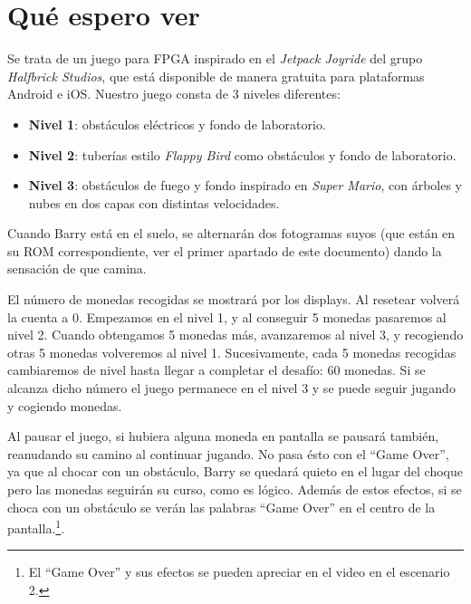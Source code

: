 \documentclass[11pt, a4paper, spanish, openright, twoside]{book}
\begin{document}
\section{Qué espero ver}
Se trata de un juego para FPGA inspirado en el  \emph{Jetpack Joyride} del grupo  \emph{Halfbrick Studios}, que está disponible de manera gratuita para plataformas Android e iOS. Nuestro juego consta de 3 niveles diferentes:

\begin{itemize}
	\item \textbf{Nivel 1}: obstáculos eléctricos y fondo de laboratorio.
	\item \textbf{Nivel 2}: tuberías estilo \emph{Flappy Bird} como obstáculos y fondo de laboratorio.
	\item \textbf{Nivel 3}: obstáculos de fuego y fondo inspirado en \emph{Super Mario}, con árboles y nubes en dos capas con distintas velocidades.
\end{itemize}

Cuando Barry está en el suelo, se alternarán dos fotogramas suyos (que están en su ROM correspondiente, ver el primer apartado de este documento) dando la sensación de que camina. 

El número de monedas recogidas se mostrará por los displays. Al resetear volverá la cuenta a 0. Empezamos en el nivel 1, y al conseguir 5 monedas pasaremos al nivel 2. Cuando obtengamos 5 monedas más, avanzaremos al nivel 3, y recogiendo otras 5 monedas volveremos al nivel 1. Sucesivamente, cada 5 monedas recogidas cambiaremos de nivel hasta llegar a completar el desafío: 60 monedas. Si se alcanza dicho número el juego permanece en el nivel 3 y se puede seguir jugando y cogiendo monedas.

Al pausar el juego, si hubiera alguna moneda en pantalla se pausará también, reanudando su camino al continuar jugando. No pasa ésto con el ``Game Over'', ya que al chocar con un obstáculo, Barry se quedará quieto en el lugar del choque pero las monedas seguirán su curso, como es lógico. Además de estos efectos, si se choca con un obstáculo se verán las palabras ``Game Over'' en el centro de la pantalla.\footnote{El ``Game Over'' y sus efectos se pueden apreciar en el video en el escenario 2.}.
\end{document}
